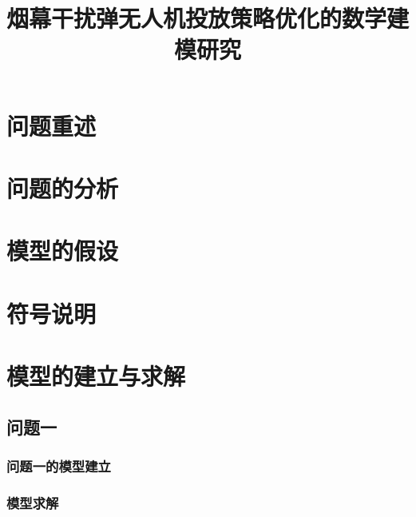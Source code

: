 \documentclass{../../../Template/cumcmthesis-2025} %
\title{烟幕干扰弹无人机投放策略优化的数学建模研究} %
\begin{document}
\maketitle



\section{问题重述}





\section{问题的分析}





\section{模型的假设}





\section{符号说明}


\section{模型的建立与求解}

\subsection{问题一}

\subsubsection{问题一的模型建立}



\subsubsection{模型求解}


\end{document}

